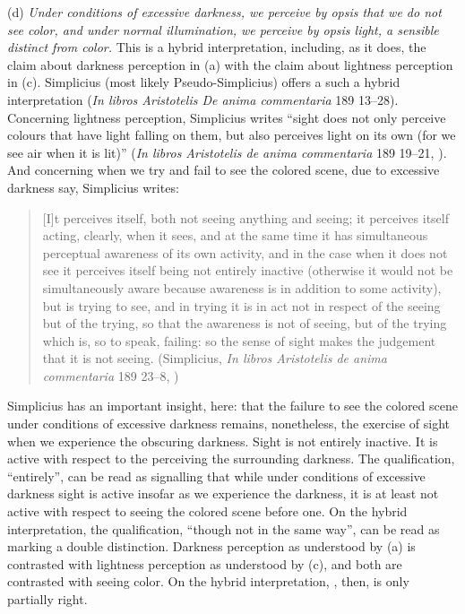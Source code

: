 (d) \emph{Under conditions of excessive darkness, we perceive by \emph{opsis} that we do not see color, and under normal illumination, we perceive by \emph{opsis} light, a sensible distinct from color.} This is a hybrid interpretation, including, as it does, the claim about darkness perception in (a) with the claim about lightness perception in (c). Simplicius (most likely Pseudo-Simplicius) offers a such a hybrid interpretation (\emph{In libros Aristotelis De anima commentaria} 189 13–28). Concerning lightness perception, Simplicius writes ``sight does not only perceive colours that have light falling on them, but also perceives light on its own (for we see air when it is lit)'' (\emph{In libros Aristotelis de anima commentaria} 189 19–21, \citealt[42]{Blumenthal:2000rf}). And concerning when we try and fail to see the colored scene, due to excessive darkness say, Simplicius writes:
\begin{quote}
	[I]t perceives itself, both not seeing anything and seeing; it perceives itself acting, clearly, when it sees, and at the same time it has simultaneous perceptual awareness of its own activity, and in the case when it does not see it perceives itself being not entirely inactive (otherwise it would not be simultaneously aware because awareness is in addition to some activity), but is trying to see, and in trying it is in act not in respect of the seeing but of the trying, so that the awareness is not of seeing, but of the trying which is, so to speak, failing: so the sense of sight makes the judgement that it is not seeing. (Simplicius, \emph{In libros Aristotelis de anima commentaria} 189 23–8, \citealt[42]{Blumenthal:2000rf})
\end{quote}
Simplicius has an important insight, here: that the failure to see the colored scene under conditions of excessive darkness remains, nonetheless, the exercise of sight when we experience the obscuring darkness. Sight is not entirely inactive. It is active with respect to the perceiving the surrounding darkness. The qualification, ``entirely'', can be read as signalling that while under conditions of excessive darkness sight is active insofar as we experience the darkness, it is at least not active with respect to seeing the colored scene before one. On the hybrid interpretation, the qualification, ``though not in the same way'', can be read as marking a double distinction. Darkness perception as understood by (a) is contrasted with lightness perception as understood by (c), and both are contrasted with seeing color. On the hybrid interpretation, \citet[275]{Ross:1961uq}, then, is only partially right.


